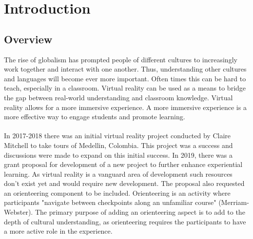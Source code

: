 \section{Introduction}
\label{sec:Introduction}

\subsection{Overview} 
The rise of globalism has prompted people of different cultures to increasingly work together and interact with one another. Thus, understanding other cultures and languages will become ever more important. Often times this can be hard to teach, especially in a classroom. Virtual reality can be used as a means to bridge the gap between real-world understanding and classroom knowledge. Virtual reality allows for a more immersive experience. A more immersive experience is a more effective way to engage students and promote learning. \\
\\
In 2017-2018 there was an initial virtual reality project conducted by Claire Mitchell to take tours of Medellin, Colombia. This project was a success and discussions were made to expand on this initial success. In 2019, there was a grant proposal for development of a new project to further enhance experiential learning. As virtual reality is a vanguard area of development such resources don't exist yet and would require new development. The proposal also requested an orienteering component to be included. Orienteering is an activity where participants "navigate between checkpoints along an unfamiliar course" (Merriam-Webster). The primary purpose of adding an orienteering aspect is to add to the depth of cultural understanding, as orienteering requires the participants to have a more active role in the experience. 
